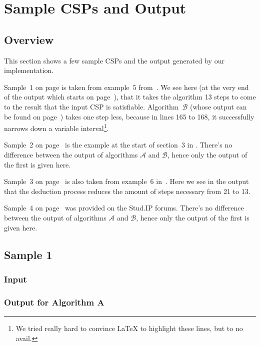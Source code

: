 
\section{Sample CSPs and Output}

\subsection*{Overview}
This section shows a few sample CSPs and the output generated by our implementation.

Sample~1 on page \pageref{app:sample-1} is taken from example~5 from~\cite{MF19}.
We see here (at the very end of the output which starts on page~\pageref{app:sample1-output-a}), that it takes the algorithm 13 steps to come to the result that the input CSP is satisfiable.
Algorithm~$\mathcal{B}$ (whose output can be found on page~\pageref{app:sample1-output-b}) takes one step less, because in lines 165 to 168, it successfully narrows down a variable interval\footnote{We tried really hard to convince LaTeX to highlight these lines, but to no avail.}.

Sample~2 on page~\pageref{app:sample-2} is the example at the start of section~3 in \cite{MF19}.
There's no difference between the output of algorithms $\mathcal{A}$ and $\mathcal{B}$, hence only the output of the first is given here.

Sample~3 on page~\pageref{app:sample-3} is also taken from example~6 in~\cite{MF19}.
Here we see in the output that the deduction process reduces the amount of steps necessary from 21 to 13.

Sample~4 on page~\pageref{app:sample-4} was provided on the Stud.IP forums.
There's no difference between the output of algorithms $\mathcal{A}$ and $\mathcal{B}$, hence only the output of the first is given here.

\clearpage
\subsection*{Sample 1}\label{app:sample-1}
\subsubsection*{Input}

\vspace{1cm}
\subsubsection*{Output for Algorithm A}\label{app:sample1-output-a}

\clearpage
